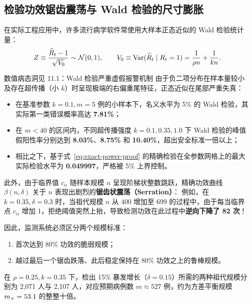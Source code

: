 \subsection{检验功效锯齿震荡与 Wald 检验的尺寸膨胀}

在实际工程应用中，许多流行病学软件常使用大样本正态近似的 Wald 检验统计量：
\begin{equation}
  Z \equiv \frac{\widehat{R}_t - 1}{\sqrt{V_0}} \sim \mathcal{N}(0, 1), \qquad V_0 \equiv \mathrm{Var}(\widehat{R}_t \mid R_t = 1) = \frac{1}{\rho n} + \frac{1}{kn}.
\end{equation}

\begin{insightbox}{数值病态洞见 11.1：Wald 检验严重虚假报警机制}
由于负二项分布在样本量较小及存在超传播（小 $k$）时呈现极端的右偏重尾特征，正态近似在尾部严重失真：
\begin{itemize}
  \item 在基准参数 $k = 0.1, m = 5$ 例的小样本下，名义水平为 5\% 的 Wald 检验，其实际第一类错误概率高达 \textbf{7.81\%}；
  \item 在 $m < 40$ 的区间内，不同超传播强度 $k = 0.1, 0.35, 1.0$ 下 Wald 检验的峰值假阳性率分别达到 \textbf{8.03\%}、\textbf{8.75\%} 和 \textbf{10.40\%}，超出安全标准一倍以上；
  \item 相比之下，基于式~\eqref{eq:exact-power-proof} 的精确检验在全参数网格上的最大实际检验水平为 \textbf{0.049997}，严格被 5\% 上界控制。
\end{itemize}

此外，由于临界值 $c_\alpha$ 随样本规模 $n$ 呈现阶梯状整数跳跃，精确功效曲线 $\beta(n, \delta)$ 关于 $n$ 表现出剧烈的\textbf{锯齿状震荡（Serration）}：
例如，在 $k = 0.35, \delta = 0.3$ 时，当祖代规模 $n$ 从 400 增加至 699 的过程中，由于每当临界点 $c_\alpha$ 增加 1，拒绝阈值突然上抬，导致检测功效在此过程中\textbf{逆向下降了 82 次}！

因此，监测系统必须区分两个规模标准：
\begin{enumerate}
  \item 首次达到 80\% 功效的脆弱规模；
  \item 越过最后一个锯齿跌落、此后稳定保持在 80\% 功效之上的鲁棒规模。
\end{enumerate}
在 $\rho = 0.25, k = 0.35$ 下，检出 15\% 暴发增长（$\delta = 0.15$）所需的两种祖代规模分别为 2{,}071 人与 2{,}107 人，对应预期病例数 $m \approx 527$ 例，约为方差平衡规模 $m_\times = 53.1$ 的整整十倍。
\end{insightbox}
